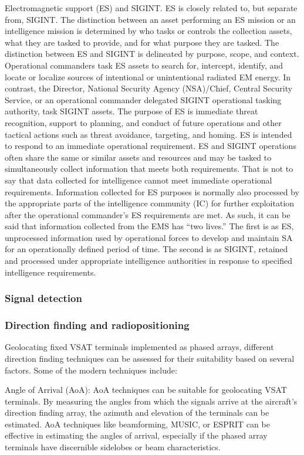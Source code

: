 \documentclass[english, 12pt, a4paper, elec, utf8, a-1b, online]{aaltothesis}
\begin{document}
Electromagnetic support (ES) and SIGINT.
ES is closely related to, but separate from, SIGINT.
The distinction between an asset performing an ES mission or an intelligence mission is
determined by who tasks or controls the collection assets, what they are tasked to provide,
and for what purpose they are tasked.
The distinction between ES and SIGINT is
delineated by purpose, scope, and context.
Operational commanders task ES assets to
search for, intercept, identify, and locate or localize sources of intentional or unintentional
radiated EM energy.
In contrast, the Director, National Security Agency (NSA)/Chief,
Central Security Service, or an operational commander delegated SIGINT operational
tasking authority, task SIGINT assets.
The purpose of ES is immediate threat recognition,
support to planning, and conduct of future operations and other tactical actions such as
threat avoidance, targeting, and homing.
ES is intended to respond to an immediate
operational requirement.
ES and SIGINT operations often share the same or similar assets
and resources and may be tasked to simultaneously collect information that meets both
requirements.
That is not to say that data collected for intelligence cannot meet immediate
operational requirements.
Information collected for ES purposes is normally also
processed by the appropriate parts of the intelligence community (IC) for further
exploitation after the operational commander’s ES requirements are met.
As such, it can
be said that information collected from the EMS has “two lives.” The first is as ES,
unprocessed information used by operational forces to develop and maintain SA for an
operationally defined period of time.
The second is as SIGINT, retained and processed
under appropriate intelligence authorities in response to specified intelligence
requirements.

\subsubsection{Signal detection}
\subsubsection{Direction finding and radiopositioning}
Geolocating fixed VSAT terminals implemented as phased arrays, different direction finding techniques can be assessed for their suitability based on several factors.
Some of the modern techniques include:

Angle of Arrival (AoA): AoA techniques can be suitable for geolocating VSAT terminals.
By measuring the angles from which the signals arrive at the aircraft's direction finding array, the azimuth and elevation of the terminals can be estimated.
AoA techniques like beamforming, MUSIC, or ESPRIT can be effective in estimating the angles of arrival, especially if the phased array terminals have discernible sidelobes or beam characteristics.
\end{document}
